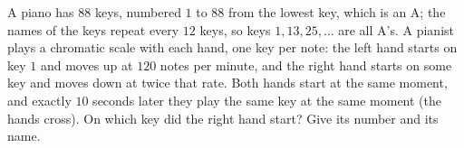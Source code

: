 A piano has $88$ keys, numbered $1$ to $88$ from the lowest key, which is an A; the names of the keys repeat every $12$ keys, so keys $1,13,25,\dots$ are all A's. A pianist plays a chromatic scale with each hand, one key per note: the left hand starts on key $1$ and moves up at $120$ notes per minute, and the right hand starts on some key and moves down at twice that rate. Both hands start at the same moment, and exactly $10$ seconds later they play the same key at the same moment (the hands cross). On which key did the right hand start? Give its number and its name.

